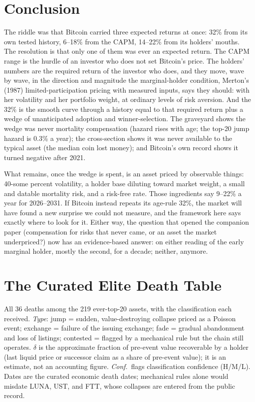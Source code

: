 \documentclass[11pt]{article}
\begin{document}
\section{Conclusion}

The riddle was that Bitcoin carried three expected returns at once: 32\% from its own tested history, 6--18\% from the CAPM, 14--22\% from its holders' mouths. The resolution is that only one of them was ever an expected return. The CAPM range is the hurdle of an investor who does not set Bitcoin's price. The holders' numbers are the required return of the investor who does, and they move, wave by wave, in the direction and magnitude the marginal-holder condition, Merton's (1987) limited-participation pricing with measured inputs, says they should: with her volatility and her portfolio weight, at ordinary levels of risk aversion. And the 32\% is the smooth curve through a history equal to that required return plus a wedge of unanticipated adoption and winner-selection. The graveyard shows the wedge was never mortality compensation (hazard rises with age; the top-20 jump hazard is 0.3\% a year); the cross-section shows it was never available to the typical asset (the median coin lost money); and Bitcoin's own record shows it turned negative after 2021.

What remains, once the wedge is spent, is an asset priced by observable things: 40-some percent volatility, a holder base diluting toward market weight, a small and datable mortality risk, and a risk-free rate. Those ingredients say 9--22\% a year for 2026--2031. If Bitcoin instead repeats its age-rule 32\%, the market will have found a new surprise we could not measure, and the framework here says exactly where to look for it. Either way, the question that opened the companion paper (compensation for risks that never came, or an asset the market underpriced?) now has an evidence-based answer: on either reading of the early marginal holder, mostly the second, for a decade; neither, anymore.

\appendix

\section{The Curated Elite Death Table}

All 36 deaths among the 219 ever-top-20 assets, with the classification each received. \emph{Type}: jump = sudden, value-destroying collapse priced as a Poisson event; exchange = failure of the issuing exchange; fade = gradual abandonment and loss of listings; contested = flagged by a mechanical rule but the chain still operates. $\delta$ is the approximate fraction of pre-event value recoverable by a holder (last liquid price or successor claim as a share of pre-event value); it is an estimate, not an accounting figure. \emph{Conf.}\ flags classification confidence (H/M/L). Dates are the curated economic death dates; mechanical rules alone would misdate LUNA, UST, and FTT, whose collapses are entered from the public record.
\end{document}
